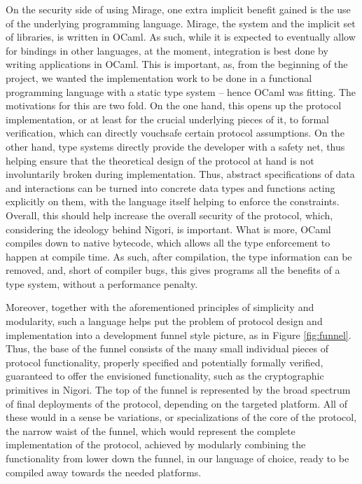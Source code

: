On the security side of using Mirage, one extra implicit benefit gained is the use of the underlying programming language.
Mirage, the system and the implicit set of libraries, is written in OCaml.
As such, while it is expected to eventually allow for bindings in other languages, at the moment, integration is best done by writing applications in OCaml.
This is important, as, from the beginning of the project, we wanted the implementation work to be done in a functional programming language with a static type system -- hence OCaml was fitting.
The motivations for this are two fold.
On the one hand, this opens up the protocol implementation, or at least for the crucial underlying pieces of it, to formal verification, which can directly vouchsafe certain protocol assumptions.
On the other hand, type systems directly provide the developer with a safety net, thus helping ensure that the theoretical design of the protocol at hand is not involuntarily broken during implementation.
Thus, abstract specifications of data and interactions can be turned into concrete data types and functions acting explicitly on them, with the language itself helping to enforce the constraints.
Overall, this should help increase the overall security of the protocol, which, considering the ideology behind Nigori, is important.
What is more, OCaml compiles down to native bytecode, which allows all the type enforcement to happen at compile time.
As such, after compilation, the type information can be removed, and, short of compiler bugs, this gives programs all the benefits of a type system, without a performance penalty.

Moreover, together with the aforementioned principles of simplicity and modularity, such a language helps put the problem of protocol design and implementation into a development funnel style picture, as in Figure \ref{fig:funnel}.
Thus, the base of the funnel consists of the many small individual pieces of protocol functionality, properly specified and potentially formally verified, guaranteed to offer the envisioned functionality, such as the cryptographic primitives in Nigori.
The top of the funnel is represented by the broad spectrum of final deployments of the protocol, depending on the targeted platform.
All of these would in a sense be variations, or specializations of the core of the protocol, the narrow waist of the funnel, which would represent the complete implementation of the protocol, achieved by modularly combining the functionality from lower down the funnel, in our language of choice, ready to be compiled away towards the needed platforms.

